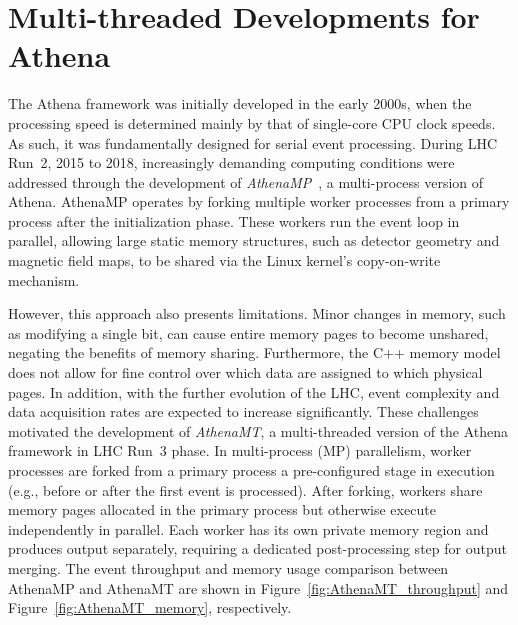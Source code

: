 \section{Multi-threaded Developments for Athena}
The Athena framework was initially developed in the early 2000s, when the processing speed is determined mainly by that of single-core CPU clock speeds. As such, it was fundamentally designed for serial event processing. During LHC Run~2, 2015 to 2018, increasingly demanding computing conditions were addressed through the development of \textit{AthenaMP}~\cite{AthenaMP}, a multi-process version of Athena. AthenaMP operates by forking multiple worker processes from a primary process after the initialization phase. These workers run the event loop in parallel, allowing large static memory structures, such as detector geometry and magnetic field maps, to be shared via the Linux kernel’s copy-on-write mechanism.

However, this approach also presents limitations. Minor changes in memory, such as modifying a single bit, can cause entire memory pages to become unshared, negating the benefits of memory sharing. Furthermore, the C++ memory model does not allow for fine control over which data are assigned to which physical pages. In addition, with the further evolution of the LHC, event complexity and data acquisition rates are expected to increase significantly. These challenges motivated the development of \textit{AthenaMT}, a multi-threaded version of the Athena framework in LHC Run~3 phase. In multi-process (MP) parallelism, worker processes are forked from a primary process a pre-configured stage in execution (e.g., before or after the first event is processed). After forking, workers share memory pages allocated in the primary process but otherwise execute independently in parallel. Each worker has its own private memory region and produces output separately, requiring a dedicated post-processing step for output merging. The event throughput and memory usage comparison between AthenaMP and AthenaMT are shown in Figure~\ref{fig:AthenaMT_throughput} and Figure~\ref{fig:AthenaMT_memory}, respectively.

